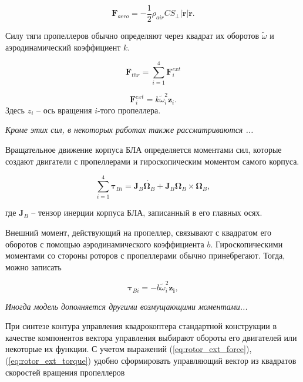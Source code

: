 \documentclass[a4paper,14pt,oneside,openany]{memoir}
\begin{document}
	\begin{equation} \label{eq:aerodynamic_force}
	\bm{F}_{aero} = - \frac{1}{2} \rho_{air} C S_{\perp} |\dot{\bm{r}}| \dot{\bm{r}}.
	\end{equation}
	
	Силу тяги пропеллеров обычно определяют через квадрат их оборотов $\tilde\omega$ и аэродинамический коэффициент $k$.
	
	\begin{equation} \label{eq:thrust_force}
	 \bm{F}_{thr} = \sum_{i=1}^{4}{ {\bm{F}_{i}^{ext}}}
	\end{equation}
	
	\begin{equation} \label{eq:rotor_ext_force}
	\bm{F}_{i}^{ext} = k \tilde\omega^2_i \bm{z}_i.
	\end{equation}
	Здесь $z_i$ -- ось вращения $i$-того пропеллера.
	
    \textit{Кроме этих сил, в некоторых работах также рассматриваются ...}
    
    Вращательное движение корпуса БЛА определяется моментами сил, которые создают двигатели с пропеллерами и гироскопическим моментом самого корпуса.
    
   	\begin{equation} \label{eq:common_rotational_motion}
   	\sum_{i=1}^{4}{\bm{\tau}_{Bi}} = \bm{J}_B\dot{\bm{\Omega}_B} + \bm{J}_B{\bm{\Omega}_B} \times \bm{\Omega}_B,
   	\end{equation}
    
	 где $\bm{J}_B$ -- тензор инерции корпуса БЛА, записанный в его главных осях.
	 
     Внешний момент, действующий на пропеллер, связывают с квадратом его оборотов с помощью аэродинамического коэффициента $b$. Гироскопическими моментами со стороны роторов с пропеллерами обычно принебрегают. Тогда, можно записать
 	
 	\begin{equation} \label{eq:rotor_ext_torque}
	\bm{\tau}_{Bi} = -b \tilde{\omega}^2_i \bm{z_i},
 	\end{equation}
   	
     \textit{Иногда модель дополняется другими возмущающими моментами...}
     
     При синтезе контура управления квадрокоптера стандартной конструкции в качестве компонентов вектора управления выбирают обороты его двигателей или некоторые их функции. С учетом выражений (\ref{eq:rotor_ext_force}), (\ref{eq:rotor_ext_torque}) удобно сформировать управляющий вектор из квадратов скоростей вращения пропеллеров
 
\end{document}
